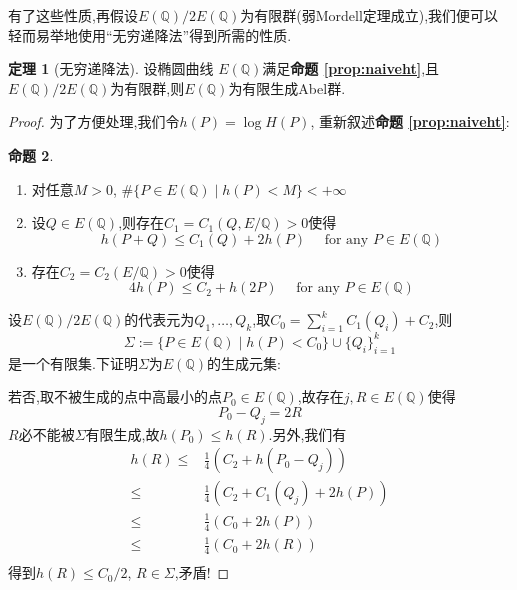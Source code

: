 \documentclass[12pt,A4paper,oneside,reqno]{amsart}
\numberwithin{equation}{section}
\theoremstyle{definition}
\newtheorem{theorem}{定理}[section]
\newtheorem{proposition}[theorem]{命题}
\theoremstyle{plain}
\theoremstyle{plain}
\numberwithin{equation}{section}
\theoremstyle{remark}
\begin{document}
有了这些性质,再假设$E(\mathbb{Q})/2E(\mathbb{Q})$为有限群(弱Mordell定理成立),我们便可以轻而易举地使用“无穷递降法”得到所需的性质.
\begin{theorem}[无穷递降法]
	设椭圆曲线 $E(\mathbb{Q})$满足\textbf{命题 \ref{prop:naiveht}},且$E(\mathbb{Q})/2E(\mathbb{Q})$为有限群,则$E(\mathbb{Q})$为有限生成Abel群.
\end{theorem}
\begin{proof}
	为了方便处理,我们令$h(P)=\log H(P)$, 重新叙述\textbf{命题 \ref{prop:naiveht}}:
	\begin{proposition}\label{prop:naiveht2}\
		\begin{enumerate}
			\item 对任意$M>0$, $\#\{P \in E(\mathbb{Q})\mid h(P)<M \} < + \infty$
			\item 设$Q \in E(\mathbb{Q})$,则存在$C_1=C_1(Q,E/\mathbb{Q})>0$使得
			$$h(P+Q) \leqslant C_1(Q)+2h(P)\quad\text{ for any }P \in E(\mathbb{Q})$$
			\item 存在$C_2=C_2(E/\mathbb{Q})>0$使得
			$$4h(P) \leqslant C_2+h(2P) \quad\text{ for any }P \in E(\mathbb{Q})$$
		\end{enumerate}
	\end{proposition}
设$E(\mathbb{Q})/2E(\mathbb{Q})$的代表元为$Q_1, \ldots , Q_k$,取$C_0=\sum_{i=1}^{k}C_1(Q_i)+C_2$,则
$$\Sigma:=\{P \in E(\mathbb{Q})\mid h(P)<C_0 \} \cup \{Q_i\}_{i=1}^k$$
是一个有限集.下证明$\Sigma$为$E(\mathbb{Q})$的生成元集:

若否,取不被生成的点中高最小的点$P_0 \in E(\mathbb{Q})$,故存在$j, R \in E(\mathbb{Q})$使得
$$P_0-Q_j=2R$$
$R$必不能被$\Sigma$有限生成,故$h(P_0)\leqslant h(R)$.另外,我们有
\begin{equation*}
\begin{aligned}
h(R) \leqslant & \frac{1}{4}(C_2+h(P_0-Q_j))\\
\leqslant & \frac{1}{4}(C_2+C_1(Q_j)+2h(P))\\
\leqslant & \frac{1}{4}(C_0+2h(P))\\
\leqslant & \frac{1}{4}(C_0+2h(R))\\
\end{aligned}
\end{equation*}
得到$h(R) \leqslant C_0/2$, $R \in \Sigma$,矛盾!
\end{proof}
\end{document}
